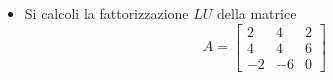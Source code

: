 \begin{itemize}
\item
Si calcoli la fattorizzazione $LU$ della matrice
\bigskip
\[
A=\left[
\begin{array}{ccc}
2 & 4 & 2 \\
4 & 4 & 6\\
-2 & -6 & 0
\end{array}\right]
\]
\end{itemize}
